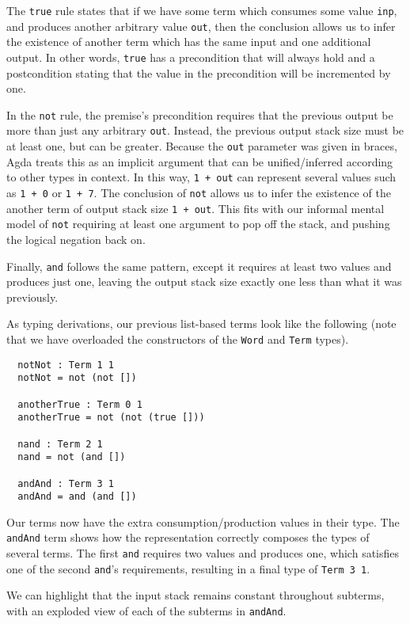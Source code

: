 \documentclass[runningheads,a4paper]{llncs}
\begin{document}
The \texttt{true} rule states that if we have some term which consumes some
value \texttt{inp}, and produces another arbitrary value \texttt{out},
then the conclusion allows us to infer the existence of another term
which has the same input and one additional output. In other words,
\texttt{true} has a precondition that will always hold and a
postcondition stating that the value in the precondition will be
incremented by one.

In the \texttt{not} rule, the premise's precondition requires that the previous output
be more than just any arbitrary \texttt{out}. Instead, the previous output
stack size must be at least one, but can be greater. Because the
\texttt{out} parameter was given in braces, Agda treats this as an
implicit argument that can be unified/inferred according to other
types in context. In this way, \texttt{1 + out} can represent several
values such as \texttt{1 + 0} or \texttt{1 + 7}. The conclusion of
\texttt{not} allows us to infer the existence of the another term of
output stack size \texttt{1 + out}. This fits with our informal mental
model of \texttt{not} requiring at least one argument to pop off the
stack, and pushing the logical negation back on.

Finally, \texttt{and} follows the same pattern, except it requires at
least two values and produces just one, leaving the output stack size exactly
one less than what it was previously.

As typing derivations, our previous list-based terms look like
the following (note that we have overloaded the constructors of the
\texttt{Word} and \texttt{Term} types).

\begin{verbatim}
  notNot : Term 1 1
  notNot = not (not [])

  anotherTrue : Term 0 1
  anotherTrue = not (not (true []))

  nand : Term 2 1
  nand = not (and [])

  andAnd : Term 3 1
  andAnd = and (and [])
\end{verbatim}

Our terms now have the extra consumption/production values in their
type. The \texttt{andAnd} term shows how the representation correctly
composes the types of several terms. The first \texttt{and} requires
two values and produces one, which satisfies one of the second
\texttt{and}'s requirements, resulting in a final type of
\texttt{Term 3 1}.

We can highlight that the input stack remains constant throughout
subterms, with an exploded view of each of the subterms in
\texttt{andAnd}.
\end{document}
